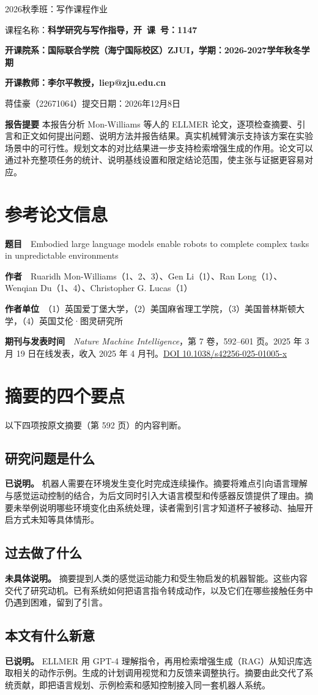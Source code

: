 \documentclass[UTF8,11pt,a4paper,twoside,fontset=none,heading=false]{ctexart}
\makeatletter
\newcommand{\CourseAssignmentTitle}{2026秋季班：写作课程作业}
\newcommand{\ReportDate}{2026年12月8日}
\newcommand{\makecoursetitle}{%
  {\centering\fontsize{18}{24}\selectfont
    \CourseAssignmentTitle\par}
  \vspace{12pt}
  {\fontsize{12}{17}\selectfont
    课程名称：\textbf{科学研究与写作指导，开\ 课\ 号：1147}\par
    \textbf{开课院系：国际联合学院（海宁国际校区）ZJUI，学期：2026-2027学年秋冬学期}\par
    \textbf{开课教师：李尔平教授，\mbox{liep@zju.edu.cn}}\par}
  \vspace{12pt}
  {\centering 蒋佳豪（22671064）\quad 提交日期：\ReportDate\par}
  \vspace{11pt}
  \textbf{报告提要}\quad
  本报告分析 Mon-Williams 等人的 ELLMER 论文，逐项检查摘要、引言和正文如何提出问题、说明方法并报告结果。真实机械臂演示支持该方案在实验场景中的可行性。规划文本的对比结果进一步支持检索增强生成的作用。论文可以通过补充整项任务的统计、说明基线设置和限定结论范围，使主张与证据更容易对应。\par
  \vspace{8pt}
  \thispagestyle{plain}
}
\makeatother
\begin{document}
\makecoursetitle
\section{参考论文信息}

\textbf{题目}　Embodied large language models enable robots to complete complex tasks in unpredictable environments

\textbf{作者}　Ruaridh Mon-Williams（1、2、3）、Gen Li（1）、Ran Long（1）、Wenqian Du（1、4）、Christopher G. Lucas（1）

\textbf{作者单位}　（1）英国爱丁堡大学，（2）美国麻省理工学院，（3）美国普林斯顿大学，（4）英国艾伦·图灵研究所

\textbf{期刊与发表时间}　\emph{Nature Machine Intelligence}，第 7 卷，592--601 页。2025 年 3 月 19 日在线发表，收入 2025 年 4 月刊。\href{https://doi.org/10.1038/s42256-025-01005-x}{DOI 10.1038/s42256-025-01005-x}

\section{摘要的四个要点}

以下四项按原文摘要（第 592 页）的内容判断。

\subsection{研究问题是什么}

\textbf{已说明。} 机器人需要在环境发生变化时完成连续操作。摘要将难点引向语言理解与感觉运动控制的结合，为后文同时引入大语言模型和传感器反馈提供了理由。摘要未举例说明哪些环境变化由系统处理，读者需到引言才知道杯子被移动、抽屉开启方式未知等具体情形。

\subsection{过去做了什么}

\textbf{未具体说明。} 摘要提到人类的感觉运动能力和受生物启发的机器智能。这些内容交代了研究动机。已有系统如何把语言指令转成动作，以及它们在哪些接触任务中仍遇到困难，留到了引言。

\subsection{本文有什么新意}

\textbf{已说明。} ELLMER 用 GPT-4 理解指令，再用检索增强生成（RAG）从知识库选取相关的动作示例。生成的计划调用视觉和力反馈来调整执行。摘要由此交代了系统贡献，即把语言规划、示例检索和感知控制接入同一套机器人系统。
\end{document}
